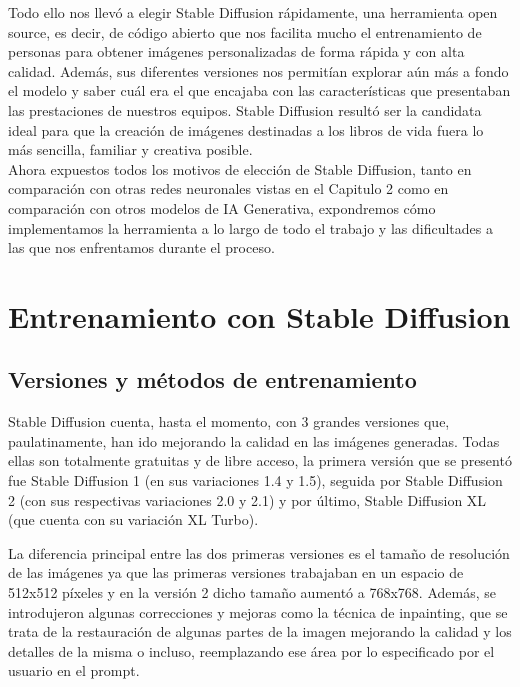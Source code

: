 Todo ello nos llevó a elegir Stable Diffusion rápidamente, una herramienta open source, es decir, de código abierto que nos facilita mucho el entrenamiento de personas para obtener imágenes personalizadas de forma rápida y con alta calidad. Además, sus diferentes versiones nos permitían explorar aún más a fondo el modelo y saber cuál era el que encajaba con las características que presentaban las prestaciones de nuestros equipos. Stable Diffusion resultó ser la candidata ideal para que la creación de imágenes destinadas a  los libros de vida fuera lo más sencilla, familiar y creativa posible. \\

Ahora expuestos todos los motivos de elección de Stable Diffusion, tanto en comparación con otras redes neuronales vistas en el Capitulo 2 como en comparación con otros modelos de IA Generativa, expondremos cómo implementamos la herramienta a lo largo de todo el trabajo y las dificultades a las que nos enfrentamos durante el proceso. \\

\section{Entrenamiento con Stable Diffusion}

\subsection{Versiones y métodos de entrenamiento}

Stable Diffusion cuenta, hasta el momento, con 3 grandes versiones que, paulatinamente, han ido mejorando la calidad en las imágenes generadas. Todas ellas son totalmente gratuitas y de libre acceso, la primera versión que se presentó fue Stable Diffusion 1 (en sus variaciones 1.4 y 1.5), seguida por Stable Diffusion 2 (con sus respectivas variaciones 2.0 y 2.1) y por último, Stable Diffusion XL (que cuenta con su variación XL Turbo). 

La diferencia principal entre las dos primeras versiones es el tamaño de resolución de las imágenes ya que las primeras versiones trabajaban en un espacio de 512x512 píxeles y en la versión 2 dicho tamaño aumentó a 768x768. Además, se introdujeron algunas correcciones y mejoras como la técnica de inpainting, que se trata de la restauración de algunas partes de la imagen mejorando la calidad y los detalles de la misma o incluso, reemplazando ese área por lo especificado por el usuario en el prompt.

